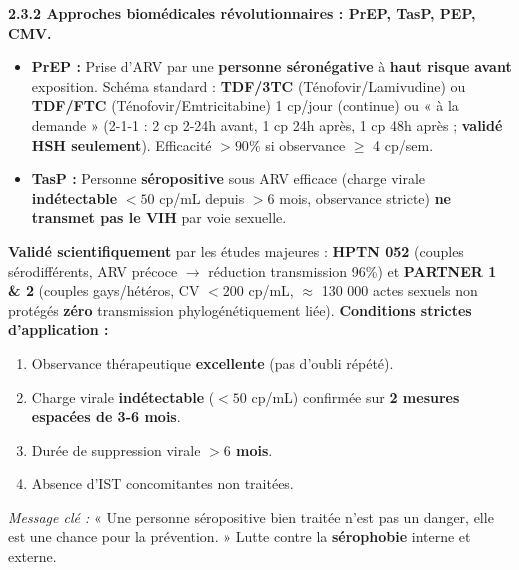 \documentclass[11pt]{article}
\begin{document}
\textbf{2.3.2 Approches biomédicales révolutionnaires : PrEP, TasP, PEP, CMV.}\par

\begin{definition}
\begin{itemize}
    \item \textbf{PrEP :} Prise d'ARV par une \textbf{personne séronégative} à \textbf{haut risque} \textbf{avant} exposition. Schéma standard : \textbf{TDF/3TC} (Ténofovir/Lamivudine) ou \textbf{TDF/FTC} (Ténofovir/Emtricitabine) 1 cp/jour (continue) ou « à la demande » (2-1-1 : 2 cp 2-24h avant, 1 cp 24h après, 1 cp 48h après ; \textbf{validé HSH seulement}). Efficacité $> 90\%$ si observance $\ge$ 4 cp/sem.
    \item \textbf{TasP :} Personne \textbf{séropositive} sous ARV efficace (charge virale \textbf{indétectable} $< 50$ cp/mL depuis $> 6$ mois, observance stricte) \textbf{ne transmet pas le VIH} par voie sexuelle.
\end{itemize}
\end{definition}

\begin{propriete}[Le principe « U = U » : Undetectable = Untransmittable (Indétectable = Intransmissible)]
\textbf{Validé scientifiquement} par les études majeures : \textbf{HPTN 052} (couples sérodifférents, ARV précoce $\to$ réduction transmission 96\%) et \textbf{PARTNER 1 \& 2} (couples gays/hétéros, CV $< 200$ cp/mL, $\approx$ 130 000 actes sexuels non protégés \textbf{zéro} transmission phylogénétiquement liée).
\textbf{Conditions strictes d'application :}
\begin{enumerate}
    \item Observance thérapeutique \textbf{excellente} (pas d'oubli répété).
    \item Charge virale \textbf{indétectable} ($< 50$ cp/mL) confirmée sur \textbf{2 mesures espacées de 3-6 mois}.
    \item Durée de suppression virale \textbf{$> 6$ mois}.
    \item Absence d'IST concomitantes non traitées.
\end{enumerate}
\emph{Message clé :} « Une personne séropositive bien traitée n'est pas un danger, elle est une chance pour la prévention. » Lutte contre la \textbf{sérophobie} interne et externe.
\end{propriete}
\end{document}

